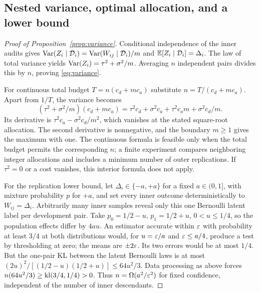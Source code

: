 \subsection{Nested variance, optimal allocation, and a lower bound}
\begin{proof}[Proof of Proposition~\ref{prop:variance}]
Conditional independence of the inner audits gives
$\operatorname{Var}(Z_i\mid\mathcal D_i)=\operatorname{Var}(W_{ij}\mid\mathcal D_i)/m$ and
$\mathbb E[Z_i\mid\mathcal D_i]=\Delta_i$.
The law of total variance yields $\operatorname{Var}(Z_i)=\tau^2+\sigma^2/m$. Averaging $n$ independent pairs divides this by $n$, proving \eqref{eq:variance}.

For continuous total budget $T=n(c_d+mc_a)$ substitute $n=T/(c_d+mc_a)$. Apart from $1/T$, the variance becomes
\[
 (\tau^2+\sigma^2/m)(c_d+mc_a)
 =\tau^2c_d+\sigma^2c_a+\tau^2c_am+\sigma^2c_d/m.
\]
Its derivative is $\tau^2c_a-\sigma^2c_d/m^2$, which vanishes at the stated square-root allocation. The second derivative is nonnegative, and the boundary $m\geq1$ gives the maximum with one. The continuous formula is feasible only when the total budget permits the corresponding $n$; a finite experiment compares neighboring integer allocations and includes a minimum number of outer replications. If $\tau^2=0$ or a cost vanishes, this interior formula does not apply.

For the replication lower bound, let $\Delta_i\in\{-a,+a\}$ for a fixed $a\in(0,1]$, with mixture probability $p$ for $+a$, and set every inner outcome deterministically to $W_{ij}=\Delta_i$. Arbitrarily many inner samples reveal only this one Bernoulli latent label per development pair. Take $p_0=1/2-u$, $p_1=1/2+u$, $0<u\leq1/4$, so the population effects differ by $4au$. An estimator accurate within $\varepsilon$ with probability at least $3/4$ at both distributions would, for $u=\varepsilon/a$ and $\varepsilon\leq a/4$, produce a test by thresholding at zero; the means are $\pm2\varepsilon$. Its two errors would be at most $1/4$. But the one-pair KL between the latent Bernoulli laws is at most $(2u)^2/[(1/2-u)(1/2+u)]\leq64u^2/3$. Data processing as above forces $n(64u^2/3)\geq\operatorname{kl}(3/4,1/4)>0$. Thus $n=\Omega(a^2/\varepsilon^2)$ for fixed confidence, independent of the number of inner descendants.
\end{proof}
